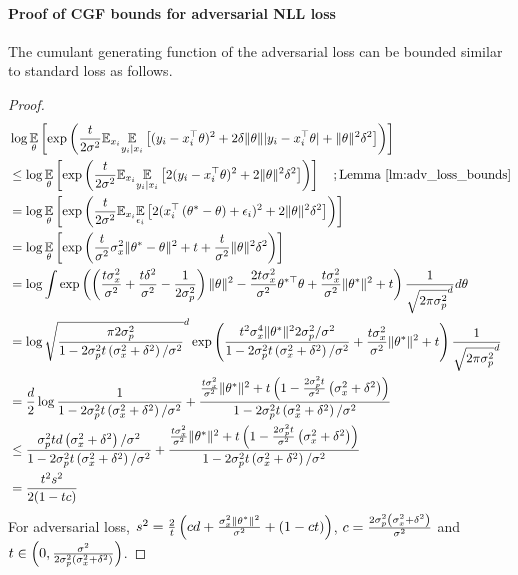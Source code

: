 \paragraph{Proof of CGF bounds for adversarial NLL loss}
The cumulant generating function of the adversarial loss can be bounded similar to standard loss as follows. 
\begin{proof}
\begin{align*}
    &\log \underset{\theta}{\mathbb{E}}\left[\exp \left( \frac{t}{2\sigma^2} \mathbb{E}_{x_i}\underset{y_i \mid x_i}{\mathbb{E}}\left[ (y_i - x_i^\top \theta)^2 + 2 \delta \Vert \theta \Vert |y_i - x_i^\top \theta|  + \Vert \theta \Vert^2 \delta^2\right] \right)\right] \\
    &\leq \log \underset{\theta}{\mathbb{E}}\left[\exp \left( \frac{t}{2\sigma^2} \mathbb{E}_{x_i}\underset{y_i \mid x_i}{\mathbb{E}}\left[ 2(y_i - x_i^\top \theta)^2 + 2 \Vert \theta \Vert^2 \delta^2\right] \right)\right] \quad; \text{Lemma \ref{lm:adv_loss_bounds}} \\
    &= \log \underset{\theta}{\mathbb{E}}\left[\exp \left( \frac{t}{2\sigma^2} \mathbb{E}_{x_i}\underset{\epsilon_i}{\mathbb{E}}\left[ 2(x_i^\top \left( \theta^* - \theta \right) + \epsilon_i)^2 + 2\Vert \theta \Vert^2 \delta^2\right] \right)\right] \\
    &= \log \underset{\theta}{\mathbb{E}}\left[\exp \left( \frac{t}{\sigma^2} \sigma_x^2 \| \theta^* - \theta \|^2 + t + \frac{t}{\sigma^2}\Vert \theta \Vert^2 \delta^2 \right)\right] \\
    &= \log \int \exp\left( \left( \frac{t\sigma_x^2}{\sigma^2} + \frac{t\delta^2}{\sigma^2} - \frac{1}{2\sigma^2_p} \right) \|\theta\|^2 - \frac{2t \sigma_x^2}{\sigma^2} \theta^{*\top} \theta + \frac{t \sigma_x^2}{\sigma^2} \|\theta^*\|^2 + t  \right) \frac{1}{\sqrt{2\pi \sigma^2_p}^d} d\theta \\
    &= \log \sqrt{\frac{\pi 2 \sigma^2_p}{1-2\sigma^2_pt\left( \sigma_x^2+\delta^2 \right)/\sigma^2}}^d \exp \left( \frac{t^2\sigma_x^4\|\theta^{*}\|^2 2\sigma^2_p/\sigma^2}{1-2\sigma^2_pt\left( \sigma_x^2+\delta^2 \right)/\sigma^2}+ \frac{t \sigma_x^2}{\sigma^2} \|\theta^*\|^2 + t \right) \frac{1}{\sqrt{2\pi \sigma^2_p}^d} \\
    &=\frac{d}{2}\log \frac{1}{1-2\sigma^2_pt\left( \sigma_x^2+\delta^2 \right)/\sigma^2} + \frac{\frac{t \sigma_x^2}{\sigma^2} \|\theta^*\|^2 + t \left( 1-\frac{2\sigma^2_p t}{\sigma^2}\left( \sigma_x^2+\delta^2 \right) \right)}{1-2\sigma^2_pt\left( \sigma_x^2+\delta^2 \right)/\sigma^2} \\
    &\leq \frac{\sigma_p^2td \left( \sigma_x^2 + \delta^2 \right)/\sigma^2}{1-2\sigma^2_pt\left( \sigma_x^2+\delta^2 \right)/\sigma^2}+ \frac{\frac{t \sigma_x^2}{\sigma^2} \|\theta^*\|^2 + t \left( 1-\frac{2\sigma^2_p t}{\sigma^2}\left( \sigma_x^2+\delta^2 \right) \right)}{1-2\sigma^2_pt\left( \sigma_x^2+\delta^2 \right)/\sigma^2} \\
    &= \frac{t^2s^2}{2(1-tc)}
\end{align*}
For adversarial loss, %
$s^2 = \frac{2}{t} \left( cd + \frac{\sigma_x^2 \|\theta^*\|^2}{\sigma^2} + \left( 1-ct \right) \right)$, $c=\frac{2\sigma^2_p\left( \sigma_x^2+\delta^2 \right)}{\sigma^2}$ and $t\in \left( 0, \frac{\sigma^2}{2\sigma^2_p\left( \sigma_x^2+\delta^2 \right)} \right)$.
\end{proof}


